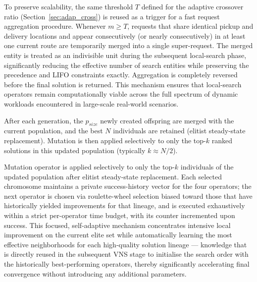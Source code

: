 \documentclass[]{interact}
\begin{document}
To preserve scalability, the same threshold $T$ defined for the adaptive crossover ratio (Section~\ref{sec:adap_cross}) is reused as a trigger for a fast request aggregation  procedure. Whenever $m \ge T$, requests that share identical pickup and delivery locations and appear consecutively (or nearly consecutively) in at least one current route are temporarily merged into a single super-request. The merged entity is treated as an indivisible unit during the subsequent local-search phase, significantly reducing the effective number of search entities while preserving the precedence and LIFO constraints exactly. Aggregation is completely reversed before the final solution is returned. This mechanism ensures that local-search operators remain computationally viable across the full spectrum of dynamic workloads encountered in large-scale real-world scenarios.




After each generation, the $p_{size}$ newly created offspring are merged with the current population, and the best $N$ individuals are retained (elitist steady-state replacement). Mutation is then applied selectively to only the top-$k$ ranked solutions in this updated population (typically $k \approx N/2$).

Mutation operator is applied selectively to only the top-$k$ individuals of the updated population after elitist steady-state replacement. Each selected chromosome maintains a private success-history vector for the four operators; the next operator is chosen via roulette-wheel selection biased toward those that have historically yielded improvements for that lineage, and is executed exhaustively within a strict per-operator time budget, with its counter incremented upon success. This focused, self-adaptive mechanism concentrates intensive local improvement on the current elite set while automatically learning the most effective neighborhoods for each high-quality solution lineage — knowledge that is directly reused in the subsequent VNS stage to initialise the search order with the historically best-performing operators, thereby significantly accelerating final convergence without introducing any additional parameters.
\end{document}
